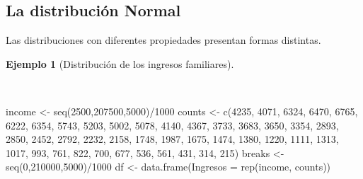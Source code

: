 \documentclass[
  a4paper,
]{scrreport}
\newenvironment{Shaded}{\begin{snugshade}}{\end{snugshade}}
\newcommand{\AttributeTok}[1]{\textcolor[rgb]{0.40,0.45,0.13}{#1}}
\newcommand{\DecValTok}[1]{\textcolor[rgb]{0.68,0.00,0.00}{#1}}
\newcommand{\FunctionTok}[1]{\textcolor[rgb]{0.28,0.35,0.67}{#1}}
\newcommand{\NormalTok}[1]{\textcolor[rgb]{0.00,0.23,0.31}{#1}}
\newcommand{\OtherTok}[1]{\textcolor[rgb]{0.00,0.23,0.31}{#1}}
\newcommand{\SpecialCharTok}[1]{\textcolor[rgb]{0.37,0.37,0.37}{#1}}
\theoremstyle{plain}
\theoremstyle{definition}
\newtheorem{example}{Ejemplo}[chapter]
\theoremstyle{definition}
\theoremstyle{remark}
\begin{document}
\subsection{La distribución Normal}\label{la-distribuciuxf3n-normal}

Las distribuciones con diferentes propiedades presentan formas
distintas.

\begin{example}[Distribución de los ingresos
familiares]\protect\hypertarget{exm-distribucion-ingresos-familiares}{}\label{exm-distribucion-ingresos-familiares}

~

\begin{Shaded}
\begin{Highlighting}[]
\NormalTok{income }\OtherTok{\textless{}{-}} \FunctionTok{seq}\NormalTok{(}\DecValTok{2500}\NormalTok{,}\DecValTok{207500}\NormalTok{,}\DecValTok{5000}\NormalTok{)}\SpecialCharTok{/}\DecValTok{1000}
\NormalTok{counts }\OtherTok{\textless{}{-}} \FunctionTok{c}\NormalTok{(}\DecValTok{4235}\NormalTok{, }\DecValTok{4071}\NormalTok{, }\DecValTok{6324}\NormalTok{, }\DecValTok{6470}\NormalTok{, }\DecValTok{6765}\NormalTok{, }\DecValTok{6222}\NormalTok{, }\DecValTok{6354}\NormalTok{, }\DecValTok{5743}\NormalTok{, }\DecValTok{5203}\NormalTok{, }\DecValTok{5002}\NormalTok{, }\DecValTok{5078}\NormalTok{, }\DecValTok{4140}\NormalTok{, }\DecValTok{4367}\NormalTok{, }\DecValTok{3733}\NormalTok{, }\DecValTok{3683}\NormalTok{, }\DecValTok{3650}\NormalTok{, }\DecValTok{3354}\NormalTok{, }\DecValTok{2893}\NormalTok{, }\DecValTok{2850}\NormalTok{, }\DecValTok{2452}\NormalTok{, }\DecValTok{2792}\NormalTok{, }\DecValTok{2232}\NormalTok{, }\DecValTok{2158}\NormalTok{, }\DecValTok{1748}\NormalTok{, }\DecValTok{1987}\NormalTok{, }\DecValTok{1675}\NormalTok{, }\DecValTok{1474}\NormalTok{, }\DecValTok{1380}\NormalTok{, }\DecValTok{1220}\NormalTok{, }\DecValTok{1111}\NormalTok{, }\DecValTok{1313}\NormalTok{, }\DecValTok{1017}\NormalTok{, }\DecValTok{993}\NormalTok{, }\DecValTok{761}\NormalTok{, }\DecValTok{822}\NormalTok{, }\DecValTok{700}\NormalTok{, }\DecValTok{677}\NormalTok{, }\DecValTok{536}\NormalTok{, }\DecValTok{561}\NormalTok{, }\DecValTok{431}\NormalTok{, }\DecValTok{314}\NormalTok{, }\DecValTok{215}\NormalTok{)}
\NormalTok{breaks }\OtherTok{\textless{}{-}} \FunctionTok{seq}\NormalTok{(}\DecValTok{0}\NormalTok{,}\DecValTok{210000}\NormalTok{,}\DecValTok{5000}\NormalTok{)}\SpecialCharTok{/}\DecValTok{1000}
\NormalTok{df }\OtherTok{\textless{}{-}} \FunctionTok{data.frame}\NormalTok{(}\AttributeTok{Ingresos =} \FunctionTok{rep}\NormalTok{(income, counts))}

\end{Highlighting}
\end{Shaded}
\end{example}
\end{document}
